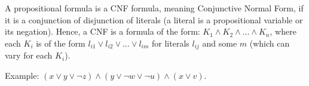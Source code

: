 \documentclass[12pt]{article}
\begin{document}
A propositional formula is a CNF formula, meaning Conjunctive Normal Form, if it is a conjunction of disjunction of literals (a literal is a propositional variable or its negation). Hence, a CNF is a formula of the form: $K_1 \wedge K_2 \wedge \ldots \wedge K_n$, where each $K_i$ is of the form $l_{i1} \vee l_{i2} \vee \ldots \vee l_{im}$ for literals $l_{ij}$ and some $m$ (which can vary for each $K_i$).

Example: $(x\vee y \vee \neg z) \wedge (y\vee  \neg w \vee \neg u) \wedge (x\vee v)$.
\end{document}
